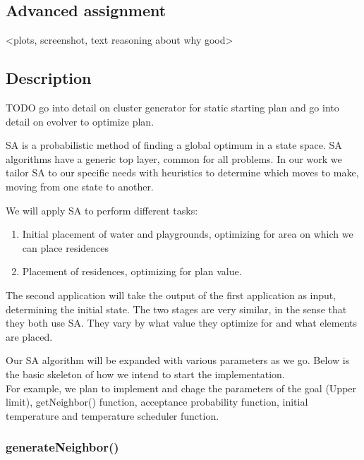 \documentclass{article}
\begin{document}
\subsection{Advanced assignment}

<plots, screenshot, text reasoning about why good>



\subsection{Description}

TODO go into detail on cluster generator for static starting plan and go into detail on evolver to optimize plan.

SA is a probabilistic method of finding a global optimum in a state space. SA algorithms have a generic top layer, common for all problems. In our work we tailor SA to our specific needs with heuristics to determine which moves to make, moving from one state to another.

We will apply SA to perform different tasks:

\begin{enumerate}
    \item Initial placement of water and playgrounds, optimizing for area on which we can place residences
    \item Placement of residences, optimizing for plan value.
\end{enumerate}

The second application will take the output of the first application as input, determining the initial state. The two stages are very similar, in the sense that they both use SA. They vary by what value they optimize for and what elements are placed.

Our SA algorithm will be expanded with various parameters as we go. Below is the basic skeleton of how we intend to start the implementation. \\ For example, we plan to implement and chage the parameters of the goal (Upper limit), getNeighbor() function, acceptance probability function, initial temperature and temperature scheduler function.%

\subsubsection{generateNeighbor()}
\end{document}
